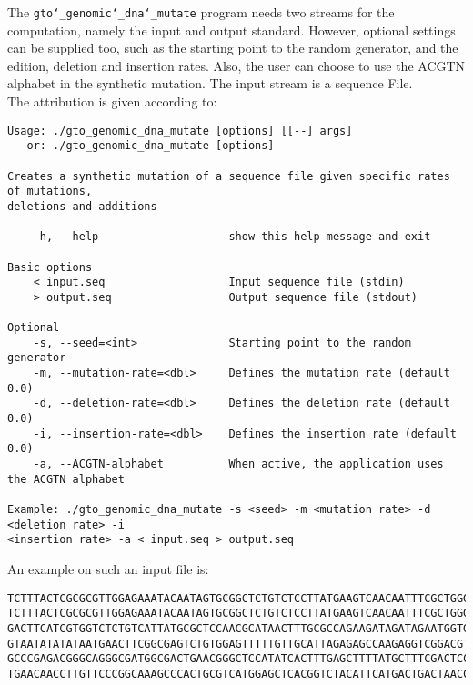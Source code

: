 The \texttt{gto\char`_genomic\char`_dna\char`_mutate} program needs two streams for the computation, namely the input and output standard. However, optional settings can be supplied too, such as the starting point to the random generator, and the edition, deletion and insertion rates. Also, the user can choose to use the ACGTN alphabet in the synthetic mutation. The input stream is a sequence File.\\
The attribution is given according to:
\begin{lstlisting}
Usage: ./gto_genomic_dna_mutate [options] [[--] args]
   or: ./gto_genomic_dna_mutate [options]

Creates a synthetic mutation of a sequence file given specific rates of mutations, 
deletions and additions

    -h, --help                    show this help message and exit

Basic options
    < input.seq                   Input sequence file (stdin)
    > output.seq                  Output sequence file (stdout)

Optional
    -s, --seed=<int>              Starting point to the random generator
    -m, --mutation-rate=<dbl>     Defines the mutation rate (default 0.0)
    -d, --deletion-rate=<dbl>     Defines the deletion rate (default 0.0)
    -i, --insertion-rate=<dbl>    Defines the insertion rate (default 0.0)
    -a, --ACGTN-alphabet          When active, the application uses the ACGTN alphabet

Example: ./gto_genomic_dna_mutate -s <seed> -m <mutation rate> -d <deletion rate> -i 
<insertion rate> -a < input.seq > output.seq
\end{lstlisting}
An example on such an input file is:
\begin{lstlisting}
TCTTTACTCGCGCGTTGGAGAAATACAATAGTGCGGCTCTGTCTCCTTATGAAGTCAACAATTTCGCTGGGACTTGCGGC
TCTTTACTCGCGCGTTGGAGAAATACAATAGTGCGGCTCTGTCTCCTTATGAAGTCAACAATTTCGCTGGGACTTGCGGC
GACTTCATCGTGGTCTCTGTCATTATGCGCTCCAACGCATAACTTTGCGCCAGAAGATAGATAGAATGGTGTAAGAAACT
GTAATATATATAATGAACTTCGGCGAGTCTGTGGAGTTTTTGTTGCATTAGAGAGCCAAGAGGTCGGACGTCCTCACGTA
GCCCGAGACGGGCAGGGCGATGGCGACTGAACGGGCTCCATATCACTTTGAGCTTTTATGCTTTCGACTCCTCCAGGAGC
TGAACAACCTTGTTCCCGGCAAAGCCCACTGCGTCATGGAGCTCACGGTCTACATTCATGACTGACTAACCGTAAACTGC
\end{lstlisting}

